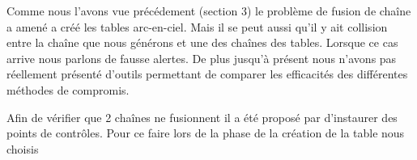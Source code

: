 	Comme nous l'avons vue précédement (section 3) le problème de fusion de chaîne a amené a créé les tables arc-en-ciel. Mais il se peut aussi qu'il y ait collision entre la chaîne que nous générons et une des chaînes des tables. Lorsque ce cas arrive nous parlons de fausse alertes.
	De plus jusqu'à présent nous n'avons pas réellement présenté d'outils permettant de comparer les efficacités des différentes méthodes de compromis.

	Afin de vérifier que 2 chaînes ne fusionnent il a été proposé par \cite{checkpoints} d'instaurer des points de contrôles. Pour ce faire lors de la phase de la création de la table nous choisis


	



\endinput{}
